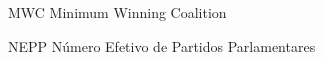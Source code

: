 \begin{siglas}
  \item[MWC] Minimum Winning Coalition
  \item[NEPP] Número Efetivo de Partidos Parlamentares

\end{siglas}
\clearpage